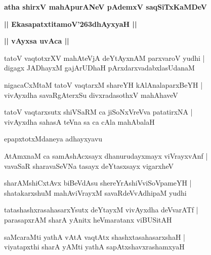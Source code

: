 \documentclass[twoside,12pt,openright]{book}
\def\S{\char'263}
\newcounter{shloka}[chapter]
\def\uvaca#1{\centerline{{\large\textbf{#1}}}}
\begin{document}
\begin{center}
{\LARGE\bfseries atha shirxV mahApurANeV pAdemxV saqSiTxKaMDeV}
\end{center}

\begin{center}
{\LARGE\bfseries || EkasapatxtitamoV\S dhAyxyaH || }
\end{center}

\uvaca{|| vAyxsa uvAca ||}

\begin{shloka}%
tatoV vaqtotxrXV mahAteVjA deYtAyxnAM parxvaroV yudhi |\\
digagx JADhayxM gajArUDhaH pArxdarxvadabxlasUdanaM
\end{shloka}

\begin{shloka}%
nigacaCxMtaM tatoV vaqtarxM shareYH kAlAnalaparxBeYH |\\
vivAyxdha savaRgAterxSu divxradasothxV  mahAhaveV 
\end{shloka}

\begin{shloka}%
tatoV vaqtarxsutx shiVSaRM ca jiSoNxVreVva patatirxNA |\\
vivAyxdha sahasA teVna sa ca cAla mahAbalaH
\end{shloka}

\begin{center}
epapxtotxMdaneya adhayxyavu
\end{center}

\begin{shloka}%
AtAmxnaM ca samAshAcxsayx dhanurudayxmayx viVrayxvAnf |\\
vavaSaR sharavaSeVNa tasayx deYtasxsayx vigarxheV 
\end{shloka}

\begin{shloka}%
sharAMshiCxtAvx biBeVdAsu shereYrAshiVviSoVpameYH |\\
shatakarxshuM mahAviVrayxM savaRdeVvAdhipaM yudhi
\end{shloka}

\begin{shloka}%
tatashashxrasahasarxYsutx deYtayxM vivAyxdha deVvarATf |\\
parasapxrAM sharA yAnitx heVmaratanx viBUSitAH 
\end{shloka}

\begin{shloka}%
saMcaraMti yathA vAtA vaqtAtx shashxtasahasarxshaH |\\
viyatapxthi sharA yAMti yathA sapAtxshavxrashamxyaH 
\end{shloka}
\end{document}
